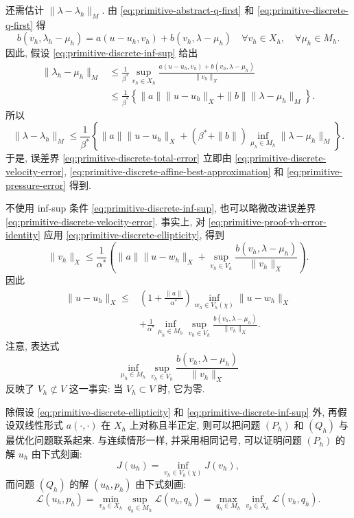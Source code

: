 \begin{Proof}
还需估计 $\|\lambda-\lambda_h\|_M$. 由
\eqref{eq:primitive-abstract-q-first} 和 \eqref{eq:primitive-discrete-q-first} 得
\[
b(v_h,\lambda_h-\mu_h)
=a(u-u_h,v_h)+b(v_h,\lambda-\mu_h)
\quad\forall v_h\in X_h,\quad\forall\mu_h\in M_h.
\]
因此, 假设 \eqref{eq:primitive-discrete-inf-sup} 给出
\begin{align*}
\|\lambda_h-\mu_h\|_M
&\leq\frac{1}{\beta^*}
\sup_{v_h\in X_h}\frac{a(u-u_h,v_h)+b(v_h,\lambda-\mu_h)}{\|v_h\|_X}\\
&\leq\frac{1}{\beta^*}
\left\{\|a\|\|u-u_h\|_X+\|b\|\|\lambda-\mu_h\|_M\right\}.
\end{align*}
所以
\begin{equation}\label{eq:primitive-pressure-error}
\|\lambda-\lambda_h\|_M
\leq\frac{1}{\beta^*}\left\{
\|a\|\|u-u_h\|_X
+(\beta^*+\|b\|)\inf_{\mu_h\in M_h}\|\lambda-\mu_h\|_M
\right\}.
\end{equation}
于是, 误差界 \eqref{eq:primitive-discrete-total-error} 立即由
\eqref{eq:primitive-discrete-velocity-error},
\eqref{eq:primitive-discrete-affine-best-approximation} 和
\eqref{eq:primitive-pressure-error} 得到.
\end{Proof}

\setcounter{statement}{0}
\begin{Remark}\label{rem:primitive-improved-velocity-error}
不使用 inf-sup 条件 \eqref{eq:primitive-discrete-inf-sup},
也可以略微改进误差界 \eqref{eq:primitive-discrete-velocity-error}.
事实上, 对 \eqref{eq:primitive-proof-vh-error-identity} 应用
\eqref{eq:primitive-discrete-ellipticity}, 得到
\[
\|v_h\|_X
\leq\frac{1}{\alpha^*}\left(
\|a\|\|u-w_h\|_X
+\sup_{v_h\in V_h}\frac{b(v_h,\lambda-\mu_h)}{\|v_h\|_X}
\right).
\]
因此
\begin{equation}\label{eq:primitive-improved-velocity-error}
\begin{split}
\|u-u_h\|_X
\leq{}&\left(1+\frac{\|a\|}{\alpha^*}\right)
\inf_{w_h\in V_h(\chi)}\|u-w_h\|_X\\
&+\frac{1}{\alpha^*}\inf_{\mu_h\in M_h}
\sup_{v_h\in V_h}\frac{b(v_h,\lambda-\mu_h)}{\|v_h\|_X}.
\end{split}
\end{equation}
注意, 表达式
\[
\inf_{\mu_h\in M_h}\sup_{v_h\in V_h}
\frac{b(v_h,\lambda-\mu_h)}{\|v_h\|_X}
\]
反映了 $V_h\not\subset V$ 这一事实: 当 $V_h\subset V$ 时, 它为零.
\end{Remark}

\setcounter{statement}{1}
\begin{Remark}\label{rem:primitive-discrete-optimization}
除假设 \eqref{eq:primitive-discrete-ellipticity} 和
\eqref{eq:primitive-discrete-inf-sup} 外, 再假设双线性形式
$a(\cdot,\cdot)$ 在 $X_h$ 上对称且半正定, 则可以把问题 $(P_h)$ 和 $(Q_h)$
与最优化问题联系起来. 与连续情形一样, 并采用相同记号, 可以证明问题 $(P_h)$
的解 $u_h$ 由下式刻画:
\[
J(u_h)=\inf_{v_h\in V_h(\chi)}J(v_h),
\]
而问题 $(Q_h)$ 的解 $(u_h,p_h)$ 由下式刻画:
\[
\mathcal L(u_h,p_h)
=\min_{v_h\in X_h}\sup_{q_h\in M_h}\mathcal L(v_h,q_h)
=\max_{q_h\in M_h}\inf_{v_h\in X_h}\mathcal L(v_h,q_h).
\]
\end{Remark}

